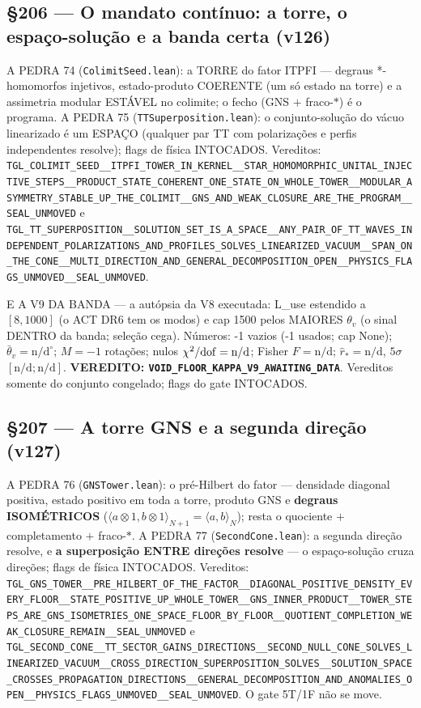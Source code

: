\documentclass[11pt]{article}
\theoremstyle{definition}\newtheorem{deriv}{Derivação}
\begin{document}
\subsection*{\S206 --- O mandato contínuo: a torre, o espaço-solução e a banda certa (v126)}A PEDRA 74 (\texttt{ColimitSeed.lean}): a TORRE do fator ITPFI — degraus *-homomorfos injetivos, estado-produto COERENTE (um só estado na torre) e a assimetria modular ESTÁVEL no colimite; o fecho (GNS $+$ fraco-$*$) é o programa. A PEDRA 75 (\texttt{TTSuperposition.lean}): o conjunto-solução do vácuo linearizado é um ESPAÇO (qualquer par TT com polarizações e perfis independentes resolve); flags de física INTOCADOS. Vereditos: \texttt{TGL\_COLIMIT\_SEED\_\_ITPFI\_TOWER\_IN\_KERNEL\_\_STAR\_HOMOMORPHIC\_UNITAL\_INJECTIVE\_STEPS\_\_PRODUCT\_STATE\_COHERENT\_ONE\_STATE\_ON\_WHOLE\_TOWER\_\_MODULAR\_ASYMMETRY\_STABLE\_UP\_THE\_COLIMIT\_\_GNS\_AND\_WEAK\_CLOSURE\_ARE\_THE\_PROGRAM\_\_SEAL\_UNMOVED} e \texttt{TGL\_TT\_SUPERPOSITION\_\_SOLUTION\_SET\_IS\_A\_SPACE\_\_ANY\_PAIR\_OF\_TT\_WAVES\_INDEPENDENT\_POLARIZATIONS\_AND\_PROFILES\_SOLVES\_LINEARIZED\_VACUUM\_\_SPAN\_ON\_THE\_CONE\_\_MULTI\_DIRECTION\_AND\_GENERAL\_DECOMPOSITION\_OPEN\_\_PHYSICS\_FLAGS\_UNMOVED\_\_SEAL\_UNMOVED}.

E A V9 DA BANDA — a autópsia da V8 executada: L\_use estendido a $[8,1000]$ (o ACT DR6 tem os modos) e cap 1500 pelos MAIORES $\theta_v$ (o sinal DENTRO da banda; seleção cega). Números: -1 vazios (-1 usados; cap None); $\bar\theta_v=\text{n/d}^{\circ}$; $M=-1$ rotações; nulos $\chi^2/{\rm dof}=\text{n/d}$; Fisher $F=\text{n/d}$; $\hat r_*=\text{n/d}$, $5\sigma$ $[\text{n/d};\text{n/d}]$. \textbf{VEREDITO: \texttt{VOID\_FLOOR\_KAPPA\_V9\_AWAITING\_DATA}}. Vereditos somente do conjunto congelado; flags do gate INTOCADOS.

\subsection*{\S207 --- A torre GNS e a segunda direção (v127)}A PEDRA 76 (\texttt{GNSTower.lean}): o pré-Hilbert do fator — densidade diagonal positiva, estado positivo em toda a torre, produto GNS e \textbf{degraus ISOMÉTRICOS} ($\langle a\otimes1,b\otimes1\rangle_{N+1}=\langle a,b\rangle_N$); resta o quociente $+$ completamento $+$ fraco-$*$. A PEDRA 77 (\texttt{SecondCone.lean}): a segunda direção resolve, e \textbf{a superposição ENTRE direções resolve} — o espaço-solução cruza direções; flags de física INTOCADOS. Vereditos: \texttt{TGL\_GNS\_TOWER\_\_PRE\_HILBERT\_OF\_THE\_FACTOR\_\_DIAGONAL\_POSITIVE\_DENSITY\_EVERY\_FLOOR\_\_STATE\_POSITIVE\_UP\_WHOLE\_TOWER\_\_GNS\_INNER\_PRODUCT\_\_TOWER\_STEPS\_ARE\_GNS\_ISOMETRIES\_ONE\_SPACE\_FLOOR\_BY\_FLOOR\_\_QUOTIENT\_COMPLETION\_WEAK\_CLOSURE\_REMAIN\_\_SEAL\_UNMOVED} e \texttt{TGL\_SECOND\_CONE\_\_TT\_SECTOR\_GAINS\_DIRECTIONS\_\_SECOND\_NULL\_CONE\_SOLVES\_LINEARIZED\_VACUUM\_\_CROSS\_DIRECTION\_SUPERPOSITION\_SOLVES\_\_SOLUTION\_SPACE\_CROSSES\_PROPAGATION\_DIRECTIONS\_\_GENERAL\_DECOMPOSITION\_AND\_ANOMALIES\_OPEN\_\_PHYSICS\_FLAGS\_UNMOVED\_\_SEAL\_UNMOVED}. O gate 5T/1F não se move.
\end{document}
